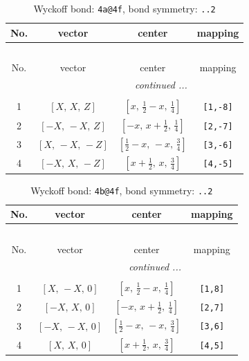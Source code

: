 \documentclass[fleqn,8pt]{jsarticle}
\begin{document}
\begin{longtable}{cccc}
\caption{Wyckoff bond: {\tt 4a@4f}, bond symmetry: {\tt ..2}}
 \\
 \hline \hline
No. & vector & center & mapping \\ \hline \endfirsthead

\multicolumn{3}{l}{\tablename\ \thetable{}} \\
 \hline \hline
No. & vector & center & mapping \\ \hline \endhead

 \hline \hline
\multicolumn{3}{r}{\footnotesize\it continued ...} \\ \endfoot

 \hline \hline
\multicolumn{3}{r}{} \\ \endlastfoot

1 & $\left[ X,\, X,\, Z \right]$ & $\left[ x,\, \frac{1}{2} - x,\, \frac{1}{4} \right]$ & {\tt [1,-8]} \\ \hline
2 & $\left[ - X,\, - X,\, Z \right]$ & $\left[ - x,\, x + \frac{1}{2},\, \frac{1}{4} \right]$ & {\tt [2,-7]} \\ \hline
3 & $\left[ X,\, - X,\, - Z \right]$ & $\left[ \frac{1}{2} - x,\, - x,\, \frac{3}{4} \right]$ & {\tt [3,-6]} \\ \hline
4 & $\left[ - X,\, X,\, - Z \right]$ & $\left[ x + \frac{1}{2},\, x,\, \frac{3}{4} \right]$ & {\tt [4,-5]} \\
\end{longtable}
\renewcommand{\arraystretch}{1.2}
\begin{longtable}{cccc}
\caption{Wyckoff bond: {\tt 4b@4f}, bond symmetry: {\tt ..2}}
 \\
 \hline \hline
No. & vector & center & mapping \\ \hline \endfirsthead

\multicolumn{3}{l}{\tablename\ \thetable{}} \\
 \hline \hline
No. & vector & center & mapping \\ \hline \endhead

 \hline \hline
\multicolumn{3}{r}{\footnotesize\it continued ...} \\ \endfoot

 \hline \hline
\multicolumn{3}{r}{} \\ \endlastfoot

1 & $\left[ X,\, - X,\, 0 \right]$ & $\left[ x,\, \frac{1}{2} - x,\, \frac{1}{4} \right]$ & {\tt [1,8]} \\ \hline
2 & $\left[ - X,\, X,\, 0 \right]$ & $\left[ - x,\, x + \frac{1}{2},\, \frac{1}{4} \right]$ & {\tt [2,7]} \\ \hline
3 & $\left[ - X,\, - X,\, 0 \right]$ & $\left[ \frac{1}{2} - x,\, - x,\, \frac{3}{4} \right]$ & {\tt [3,6]} \\ \hline
4 & $\left[ X,\, X,\, 0 \right]$ & $\left[ x + \frac{1}{2},\, x,\, \frac{3}{4} \right]$ & {\tt [4,5]} \\
\end{longtable}
\end{document}
